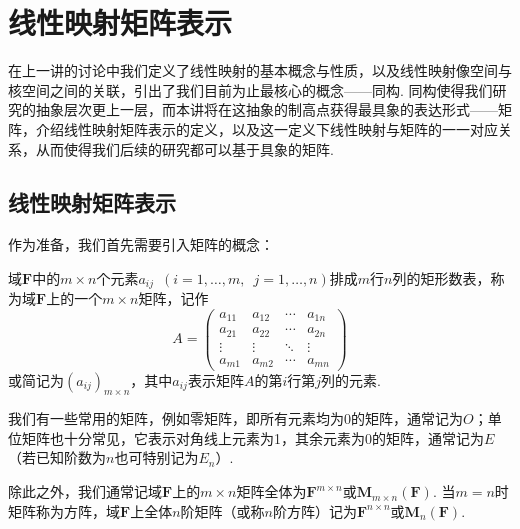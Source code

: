 \chapter{线性映射矩阵表示}

在上一讲的讨论中我们定义了线性映射的基本概念与性质，以及线性映射像空间与核空间之间的关联，引出了我们目前为止最核心的概念——同构. 同构使得我们研究的抽象层次更上一层，而本讲将在这抽象的制高点获得最具象的表达形式——矩阵，介绍线性映射矩阵表示的定义，以及这一定义下线性映射与矩阵的一一对应关系，从而使得我们后续的研究都可以基于具象的矩阵.

\section{线性映射矩阵表示}

作为准备，我们首先需要引入矩阵的概念：
\begin{definition}{}{}
    域$\mathbf{F}$中的$m\times n$个元素$a_{ij}\enspace(i=1,\ldots,m,\enspace j=1,\ldots,n)$排成$m$行$n$列的矩形数表，称为域$\mathbf{F}$上的一个$m\times n$矩阵，记作
    \[A=\begin{pmatrix}
            a_{11} & a_{12} & \cdots & a_{1n} \\
            a_{21} & a_{22} & \cdots & a_{2n} \\
            \vdots & \vdots & \ddots & \vdots \\
            a_{m1} & a_{m2} & \cdots & a_{mn}
        \end{pmatrix}\]
    或简记为$(a_{ij})_{m\times n}$，其中$a_{ij}$表示矩阵$A$的第$i$行第$j$列的元素.
\end{definition}

我们有一些常用的矩阵，例如零矩阵，即所有元素均为0的矩阵，通常记为$O$；单位矩阵也十分常见，它表示对角线上元素为1，其余元素为0的矩阵，通常记为$E$（若已知阶数为$n$也可特别记为$E_n$）.

除此之外，我们通常记域$\mathbf{F}$上的$m\times n$矩阵全体为$\mathbf{F}^{m\times n}$或$\mathbf{M}_{m\times n}(\mathbf{F})$. 当$m=n$时矩阵称为方阵，域$\mathbf{F}$上全体$n$阶矩阵（或称$n$阶方阵）记为$\mathbf{F}^{n\times n}$或$\mathbf{M}_n(\mathbf{F})$.


